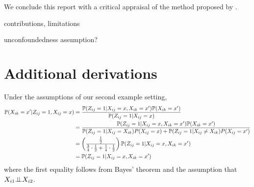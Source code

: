 \documentclass[10pt]{article}
\begin{document}
\todo We conclude this report with a critical appraisal of the method proposed by \textcite{Forastiere:2021}.

\todo contributions, limitations

\todo unconfoundedness assumption? \textcite{Sanchez:2021}


\newpage


\begin{refcontext}[sorting=nyt]
\printbibliography
\end{refcontext}


\newpage

\appendix

\section{Additional derivations}

Under the assumptions of our second example setting,
\begin{align*}
\P(X_{ik}=x'|Z_{ij}=1,X_{ij}=x) &= \frac{\P(Z_{ij}=1|X_{ij}=x,X_{ik}=x')\P(X_{ik}=x')}{\P(Z_{ij}=1|X_{ij}=x)} \\
&= \frac{\P(Z_{ij}=1|X_{ij}=x,X_{ik}=x')\P(X_{ik}=x')}{\P(Z_{ij}=1|X_{ij}=X_{ik})P(X_{ij}=x) + \P(Z_{ij}=1|X_{ij}\neq X_{ik})P(X_{ij}=x')} \\
&= \left(\frac{\frac{1}{2}}{\frac{3}{4}\cdot\frac{1}{2}+\frac{1}{4}\cdot\frac{1}{2}}\right)\P(Z_{ij}=1|X_{ij}=x,X_{ik}=x') \\
&= \P(Z_{ij}=1|X_{ij}=x,X_{ik}=x')
\end{align*}
where the first equality follows from Bayes' theorem and the assumption that $X_{i1}\condind X_{i2}$.
\end{document}
